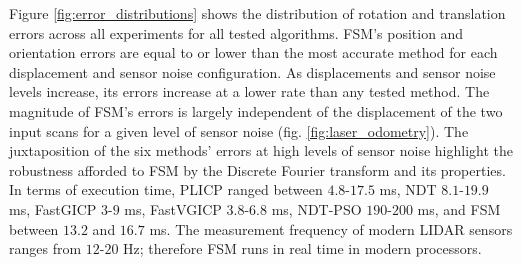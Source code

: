\begin{figure*}
\begin{framed}
  \vspace{-0.75cm}\hspace{-0.75cm}
    \subfloat{}
    \qquad \hspace{-1.25cm}
    \subfloat{}
    \vspace{-2.5cm}
    \caption{\small Distribution of orientation and position errors across a
             range of maximal positional and orientational displacements, for
             progressively larger sensor measurement noise levels. Each boxplot
             represents $10$ iterations over $\sum|D_k| \approx
             45$$\cdot$$10^3$ random scan pairs for each configuration,
             $k=1,\dots,5$. Dots signify mean errors. FSM's errors are largely
             independent of the initial displacement of scans for a given level
             of sensor noise}%
    \label{fig:error_distributions}%
\end{framed}
\end{figure*}

Figure \ref{fig:error_distributions} shows the distribution of rotation and
translation errors across all experiments for all tested algorithms.  FSM's
position and orientation errors are equal to or lower than the most accurate
method for each displacement and sensor noise configuration. As displacements
and sensor noise levels increase, its errors increase at a lower rate than any
tested method. The magnitude of FSM's errors is largely independent of the
displacement of the two input scans for a given level of sensor noise (fig.
\ref{fig:laser_odometry}). The juxtaposition of the six methods' errors at high
levels of sensor noise highlight the robustness afforded to FSM by the Discrete
Fourier transform and its properties.  In terms of execution time, PLICP ranged
between $4.8$-$17.5$ ms, NDT $8.1$-$19.9$ ms, FastGICP $3$-$9$ ms, FastVGICP
$3.8$-$6.8$ ms, NDT-PSO $190$-$200$ ms, and FSM between $13.2$ and $16.7$ ms.
The measurement frequency of modern LIDAR sensors ranges from $12$-$20$ Hz;
therefore FSM runs in real time in modern processors.
